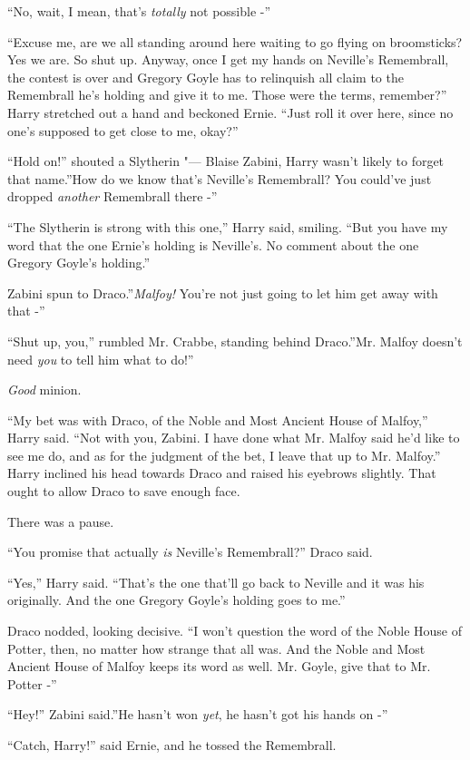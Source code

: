 ``No, wait, I mean, that's \emph{totally} not possible -''

``Excuse me, are we all standing around here waiting to go flying on
broomsticks? Yes we are. So shut up. Anyway, once I get my hands on
Neville's Remembrall, the contest is over and Gregory Goyle has to
relinquish all claim to the Remembrall he's holding and give it to me.
Those were the terms, remember?'' Harry stretched out a hand and
beckoned Ernie. ``Just roll it over here, since no one's supposed to get
close to me, okay?''

``Hold on!'' shouted a Slytherin "--- Blaise Zabini, Harry wasn't likely to
forget that name.''How do we know that's Neville's Remembrall? You
could've just dropped \emph{another} Remembrall there -''

``The Slytherin is strong with this one,'' Harry said, smiling. ``But
you have my word that the one Ernie's holding is Neville's. No comment
about the one Gregory Goyle's holding.''

Zabini spun to Draco.''\emph{Malfoy!} You're not just going to let him
get away with that -''

``Shut up, you,'' rumbled Mr. Crabbe, standing behind Draco.''Mr. Malfoy
doesn't need \emph{you} to tell him what to do!''

\emph{Good} minion.

``My bet was with Draco, of the Noble and Most Ancient House of
Malfoy,'' Harry said. ``Not with you, Zabini. I have done what Mr.
Malfoy said he'd like to see me do, and as for the judgment of the bet,
I leave that up to Mr. Malfoy.'' Harry inclined his head towards Draco
and raised his eyebrows slightly. That ought to allow Draco to save
enough face.

There was a pause.

``You promise that actually \emph{is} Neville's Remembrall?'' Draco said.

``Yes,'' Harry said. ``That's the one that'll go back to Neville and it
was his originally. And the one Gregory Goyle's holding goes to me.''

Draco nodded, looking decisive. ``I won't question the word of the Noble
House of Potter, then, no matter how strange that all was. And the Noble
and Most Ancient House of Malfoy keeps its word as well. Mr. Goyle, give
that to Mr. Potter -''

``Hey!'' Zabini said.''He hasn't won \emph{yet}, he hasn't got his hands
on -''

``Catch, Harry!'' said Ernie, and he tossed the Remembrall.

